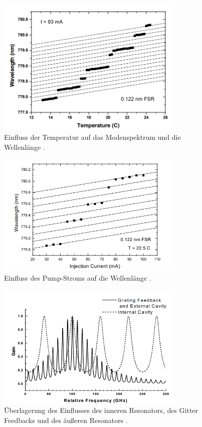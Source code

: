 \begin{figure}
    \centering
    \includegraphics[width=0.8\textwidth]{ModeTemp.png}
    \caption{Einfluss der Temperatur auf das Modenspektrum und die Wellenlänge \cite{ap60}.}
    \label{fig:Temp}
\end{figure}


\begin{figure}
    \centering
    \includegraphics[width=0.8\textwidth]{ModeCurr.png}
    \caption{Einfluss des Pump-Stroms auf die Wellenlänge \cite{ap60}.}
    \label{fig:Curr}
\end{figure}


\begin{figure}
    \centering
    \includegraphics[width=0.8\textwidth]{CavityIdeal.png}
    \caption{Überlagerung des Einflusses des inneren Resonators, des Gitter Feedbacks und des äußeren Resonators \cite{ap60}.}
    \label{fig:GainIdeal}
\end{figure}


